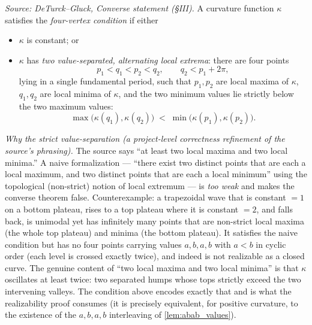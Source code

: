 \begin{definition}
  \label{def:four_vertex_condition}
  \textit{Source: DeTurck--Gluck, Converse statement (§III).}
  A curvature function $\kappa$ satisfies the \emph{four-vertex condition} if
  either
  \begin{itemize}
    \item $\kappa$ is constant; or
    \item $\kappa$ has \emph{two value-separated, alternating local extrema}:
      there are four points
      \[
        p_1 < q_1 < p_2 < q_2, \qquad q_2 < p_1 + 2\pi,
      \]
      lying in a single fundamental period, such that $p_1, p_2$ are local
      maxima of $\kappa$, $q_1, q_2$ are local minima of $\kappa$, and the two
      minimum values lie strictly below the two maximum values:
      \[
        \max\bigl(\kappa(q_1), \kappa(q_2)\bigr) \;<\; \min\bigl(\kappa(p_1), \kappa(p_2)\bigr).
      \]
  \end{itemize}

  \emph{Why the strict value-separation (a project-level correctness refinement
  of the source's phrasing).} The source says ``at least two local maxima and
  two local minima.'' A naive formalization --- ``there exist two distinct points
  that are each a local maximum, and two distinct points that are each a local
  minimum'' using the topological (non-strict) notion of local extremum --- is
  \emph{too weak} and makes the converse theorem false. Counterexample: a
  trapezoidal wave that is constant $=1$ on a bottom plateau, rises to a top
  plateau where it is constant $=2$, and falls back, is unimodal yet has
  infinitely many points that are non-strict local maxima (the whole top
  plateau) and minima (the bottom plateau). It satisfies the naive condition but
  has no four points carrying values $a,b,a,b$ with $a<b$ in cyclic order
  (each level is crossed exactly twice), and indeed is not realizable as a closed
  curve. The genuine content of ``two local maxima and two local minima'' is that
  $\kappa$ oscillates at least twice: two separated humps whose tops strictly
  exceed the two intervening valleys. The condition above encodes exactly that
  and is what the realizability proof consumes (it is precisely equivalent, for
  positive curvature, to the existence of the $a,b,a,b$ interleaving of
  \cref{lem:abab_values}).
\end{definition}

